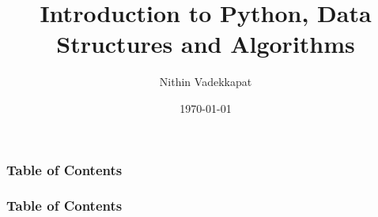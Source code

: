 \documentclass{beamer}
\title{Introduction to Python, Data Structures and Algorithms}
\author{Nithin Vadekkapat}
\date{\today}
\begin{document}
\begin{frame}
    \titlepage
\end{frame}

\begin{frame}
    \frametitle{Table of Contents}
    \tableofcontents[sections={1-4},hideallsubsections]
\end{frame}

\begin{frame}
    \frametitle{Table of Contents}
    \tableofcontents[sections={5-8},hideallsubsections]
\end{frame}










\end{document}
